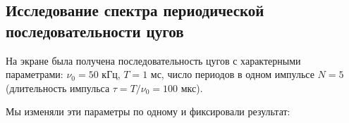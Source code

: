 \subsection*{Исследование спектра периодической последовательности цугов}
На экране была получена последовательность цугов с характерными параметрами: $\nu_0 = 50$ кГц, $T = 1$ мс, число периодов в одном импульсе $N = 5$ (длительность импульса $\tau = T/\nu_0 = 100$ мкс).
\begin{figure}[H]
    \centering
\end{figure}
\n
Мы изменяли эти параметры по одному и фиксировали результат:
\begin{figure}[H]
    \centering
    \\
    \end{figure}

